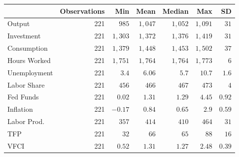 \begin{longtable}{l|rrrrrr}
\toprule
\multicolumn{1}{l}{} & Observations & Min & Mean & Median & Max & SD \\ 
\midrule\addlinespace[2.5pt]
Output & 221 & $985$ & $1,047$ & $1,052$ & $1,091$ & $31$ \\ 
Investment & 221 & $1,303$ & $1,372$ & $1,376$ & $1,419$ & $31$ \\ 
Consumption & 221 & $1,379$ & $1,448$ & $1,453$ & $1,502$ & $37$ \\ 
Hours Worked & 221 & $1,751$ & $1,764$ & $1,764$ & $1,773$ & $6$ \\ 
Unemployment & 221 & $3.4$ & $6.06$ & $5.7$ & $10.7$ & $1.6$ \\ 
Labor Share & 221 & $456$ & $466$ & $467$ & $473$ & $4$ \\ 
Fed Funds & 221 & $0.02$ & $1.31$ & $1.29$ & $4.45$ & $0.92$ \\ 
Inflation & 221 & $-0.17$ & $0.84$ & $0.65$ & $2.9$ & $0.59$ \\ 
Labor Prod. & 221 & $357$ & $414$ & $410$ & $464$ & $31$ \\ 
TFP & 221 & $32$ & $66$ & $65$ & $88$ & $16$ \\ 
VFCI & 221 & $0.52$ & $1.31$ & $1.27$ & $2.48$ & $0.39$ \\ 
\bottomrule
\end{longtable}
